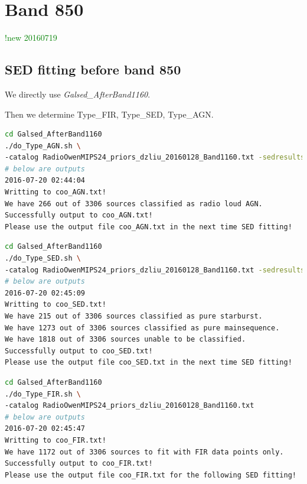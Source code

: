 \documentclass[11pt,a4paper]{article}
\begin{document}

\clearpage

\section{Band 850}

\textcolor{green}{!new 20160719}

\subsection{SED fitting before band 850}
\label{Band850_Galsed}

We directly use \textit{Galsed\_AfterBand1160}. 

Then we determine Type\_FIR, Type\_SED, Type\_AGN. 

\begin{lstlisting}[language=bash]
cd Galsed_AfterBand1160
./do_Type_AGN.sh \
-catalog RadioOwenMIPS24_priors_dzliu_20160128_Band1160.txt -sedresults ResLMT*.txt
# below are outputs
2016-07-20 02:44:04
Writting to coo_AGN.txt!
We have 266 out of 3306 sources classified as radio loud AGN.
Successfully output to coo_AGN.txt!
Please use the output file coo_AGN.txt in the next time SED fitting!
\end{lstlisting}

\begin{lstlisting}[language=bash]
cd Galsed_AfterBand1160
./do_Type_SED.sh \
-catalog RadioOwenMIPS24_priors_dzliu_20160128_Band1160.txt -sedresults ResLMT*.txt
# below are outputs
2016-07-20 02:45:09
Writting to coo_SED.txt!
We have 215 out of 3306 sources classified as pure starburst.
We have 1273 out of 3306 sources classified as pure mainsequence.
We have 1818 out of 3306 sources unable to be classified.
Successfully output to coo_SED.txt!
Please use the output file coo_SED.txt in the next time SED fitting!
\end{lstlisting}

\begin{lstlisting}[language=bash]
cd Galsed_AfterBand1160
./do_Type_FIR.sh \
-catalog RadioOwenMIPS24_priors_dzliu_20160128_Band1160.txt
# below are outputs
2016-07-20 02:45:47
Writting to coo_FIR.txt!
We have 1172 out of 3306 sources to fit with FIR data points only.
Successfully output to coo_FIR.txt!
Please use the output file coo_FIR.txt for the following SED fitting!
\end{lstlisting}
\end{document}
